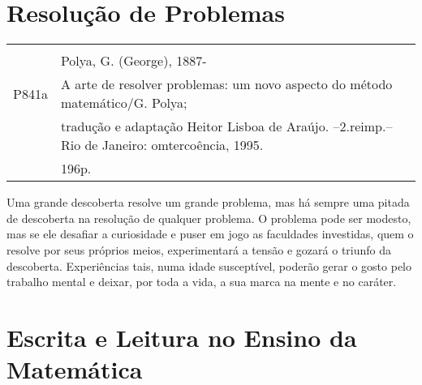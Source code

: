 \section{Resolução de Problemas}

 \nocite{polya1995arte}


\thispagestyle{empty}

\begin{footnotesize}
\begin{center}
\begin{tabular}{|cl|} \hline
\hspace{1cm} & \\
& Polya, G. (George), 1887- \\
P841a & \hspace{0.6cm}  A arte de resolver problemas: um novo aspecto do método matemático/G. Polya; \\ &tradução e adaptação Heitor Lisboa de Araújo. --2.reimp.--Rio de Janeiro: omtercoência, 1995.\\
& 196p.\\ \hline
\end{tabular}
\end{center}
\end{footnotesize}%
\hspace*{-1cm}


Uma grande descoberta resolve um grande problema, mas há sempre uma pitada de descoberta na resolução de qualquer problema. O problema pode ser modesto, mas se ele desafiar a curiosidade e puser em jogo as faculdades investidas, quem o resolve por seus próprios meios, experimentará a tensão e gozará o triunfo da descoberta. Experiências tais, numa idade susceptível, poderão gerar o gosto pelo trabalho mental e deixar, por toda a vida, a sua marca na mente e no caráter.

\section{Escrita e Leitura no Ensino da Matemática}


